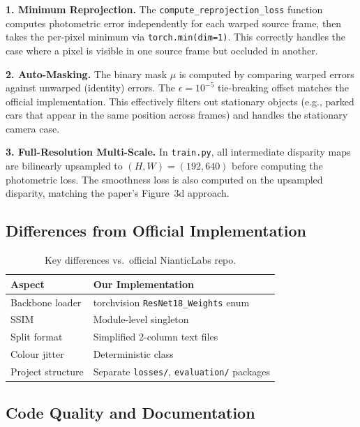 \documentclass[10pt, a4paper, twocolumn]{article}
\begin{document}
\textbf{1. Minimum Reprojection.} The \texttt{compute\_reprojection\_loss} function computes photometric error independently for each warped source frame, then takes the per-pixel minimum via \texttt{torch.min(dim=1)}. This correctly handles the case where a pixel is visible in one source frame but occluded in another.

\textbf{2. Auto-Masking.} The binary mask $\mu$ is computed by comparing warped errors against unwarped (identity) errors. The $\epsilon = 10^{-5}$ tie-breaking offset matches the official implementation. This effectively filters out stationary objects (e.g., parked cars that appear in the same position across frames) and handles the stationary camera case.

\textbf{3. Full-Resolution Multi-Scale.} In \texttt{train.py}, all intermediate disparity maps are bilinearly upsampled to $(H, W) = (192, 640)$ before computing the photometric loss. The smoothness loss is also computed on the upsampled disparity, matching the paper's Figure~3d approach.

\subsection{Differences from Official Implementation}

\begin{table}[H]
\centering
\caption{Key differences vs.\ official NianticLabs repo.}
\label{tab:diff}
\begin{tabular}{@{}p{3.0cm}p{4.4cm}@{}}
\toprule
\textbf{Aspect} & \textbf{Our Implementation} \\
\midrule
Backbone loader & torchvision \texttt{ResNet18\_Weights} enum \\
SSIM & Module-level singleton \\
Split format & Simplified 2-column text files \\
Colour jitter & Deterministic class \\
Project structure & Separate \texttt{losses/}, \texttt{evaluation/} packages \\
\bottomrule
\end{tabular}
\end{table}

\subsection{Code Quality and Documentation}
\end{document}

